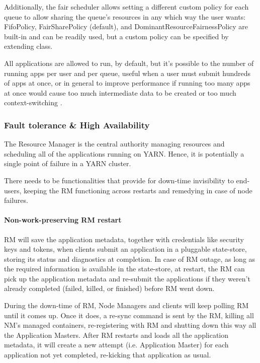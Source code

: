 Additionally, the fair scheduler allows setting a different custom policy for each queue to allow sharing the queue’s resources in any which way the user wants: FifoPolicy, FairSharePolicy (default), and DominantResourceFairnessPolicy are built-in and can be readily used, but a custom policy can be specified by extending \texttt{} class. 

All applications are allowed to run, by default, but it's possible to the number of running apps per user and per queue, useful when a user must submit hundreds of apps at once, or in general to improve performance if running too many apps at once would cause too much intermediate data to be created or too much context-switching \cite{yarn_FairSched}.

\subsubsection{Fault tolerance \& High Availability}

The Resource Manager is the central authority managing resources and scheduling all of the applications running on YARN. Hence, it is potentially a single point of failure in a YARN cluster. 

There needs to be functionalities that provide for down-time invisibility to end-users, keeping the RM functioning across restarts and remedying in case of node failures.

\paragraph{Non-work-preserving RM restart} RM will save the application metadata, together with credentials like security keys and tokens, when clients submit an application in a pluggable state-store, storing its status and diagnostics at completion. In case of RM outage, as long as the required information is available in the state-store, at restart, the RM can pick up the application metadata and re-submit the applications if they weren't already completed (failed, killed, or finished) before RM went down.

During the down-time of RM, Node Managers and clients will keep polling RM until it comes up. Once it does, a re-sync command is sent by the RM, killing all NM's managed containers, re-registering with RM and shutting down this way all the Application Masters. After RM restarts and loads all the application metadata, it will create a new attempt (i.e. Application Master) for each application not yet completed, re-kicking that application as usual.

